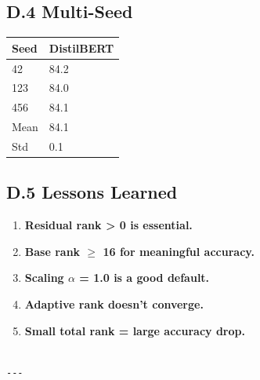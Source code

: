 \subsection{D.4 Multi-Seed}

\begin{table}[H]
\centering
\small
\begin{tabular}{ll}
\toprule
\textbf{Seed} & \textbf{DistilBERT} \\
\midrule
42 & 84.2 \\
123 & 84.0 \\
456 & 84.1 \\
Mean & 84.1 \\
Std & 0.1 \\
\bottomrule
\end{tabular}
\end{table}

\subsection{D.5 Lessons Learned}

\begin{enumerate}
\item \textbf{Residual rank > 0 is essential.}
\item \textbf{Base rank $\ge$ 16 for meaningful accuracy.}
\item \textbf{Scaling $\alpha$ = 1.0 is a good default.}
\item \textbf{Adaptive rank doesn't converge.}
\item \textbf{Small total rank = large accuracy drop.}
\end{enumerate}
\begin{lstlisting}

---
\end{lstlisting}